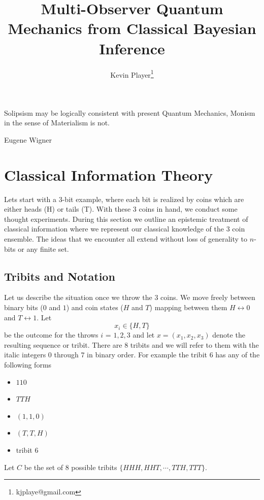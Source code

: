 \documentclass[12pt,a4paper]{article}
\theoremstyle{myrule}
\theoremstyle{postulate}
\theoremstyle{definition}
\begin{document}
\title{Multi-Observer Quantum Mechanics from Classical Bayesian Inference}
\author[1]{Kevin Player\footnote{kjplaye@gmail.com}}

\maketitle


\epigraph{Solipsism may be logically consistent with present Quantum Mechanics, Monism in the sense of Materialism is not.}{Eugene Wigner}


\section{Classical Information Theory}
Lets start with a 3-bit example, where each bit is realized by coins which are either heads (H) or tails (T).  With these 3 coins in hand, we conduct some thought experiments.  During this section we outline an epistemic treatment of classical information where we represent our classical knowledge of the 3 coin ensemble. The ideas that we encounter all extend without loss of generality to $n$-bits or any finite set.

\subsection{Tribits and Notation}
Let us describe the situation once we throw the 3 coins.  We move freely between binary bits ($0$ and $1$) and coin states ($H$ and $T$) mapping between them $H \leftrightarrow 0$ and $T \leftrightarrow 1$. Let
\[
x_i \in \{H,T\}
\]
be the outcome for the throws $i$ = $1,2,3$ and let $x = (x_1, x_2, x_3)$ denote the resulting sequence or tribit.  There are 8 tribits and we will refer to them with the italic integers $\mathit{0}$ through $\mathit{7}$ in binary order.  For example the tribit $\mathit{6}$ has any of the following forms
\begin{itemize}
\item $110$
\item $TTH$
\item $(1,1,0)$
\item $(T,T,H)$
\item tribit $\mathit{6}$
\end{itemize}
Let $C$ be the set of 8 possible tribits $\{HHH,HHT,\cdots,TTH, TTT\}$. 
  
\end{document}
